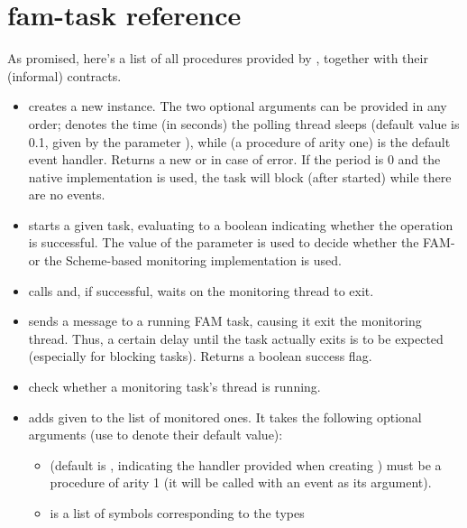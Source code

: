 
\chapter{fam-task reference}
\label{cha:scmf-task-refer}

As promised, here's a list of all procedures provided by
, together with their (informal) contracts.

\begin{itemize}
\item{} creates a new
   instance. The two optional arguments can be provided
  in any order;  denotes the time (in seconds) the polling
  thread sleeps (default value is 0.1, given by the parameter
  ), while  (a
  procedure of arity one) is the default event handler. Returns a new
   or  in case of error. If the period is 0 and
  the native implementation is used, the task will block (after
  started) while there are no events.
\item{} starts a given task, evaluating
  to a boolean indicating whether the operation is successful. The
  value of the parameter  is used to decide
  whether the FAM- or the Scheme-based monitoring implementation is
  used.
\item{} calls  and, if
  successful, waits on the monitoring thread to exit.
\item{} sends a message to a running FAM
  task, causing it exit the monitoring thread. Thus, a certain delay
  until the task actually exits is to be expected (especially for
  blocking tasks). Returns a boolean success flag.
\item{} check whether a monitoring
  task's thread is running.
\item{} adds given  to the list of monitored ones.
  It takes the following optional arguments (use  to denote
  their default value):
  \begin{itemize}
  \item {} (default is , indicating the handler
    provided when creating ) must be a procedure of
    arity 1 (it will be called with an event as its argument).
  \item {} is a list of symbols corresponding to the types

\end{itemize}
\end{itemize}
